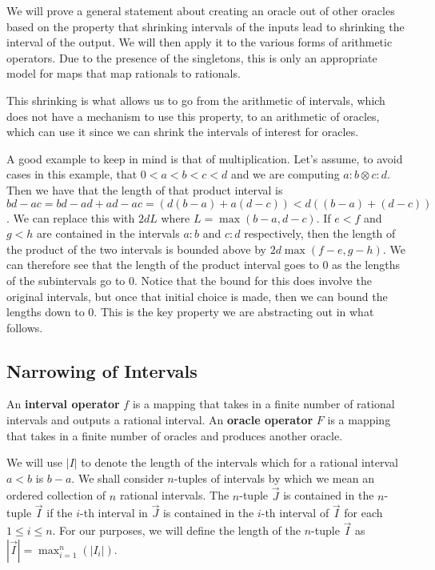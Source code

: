 \documentclass[12pt]{article}
\theoremstyle{remark}
\begin{document}
We will prove a general statement about creating an oracle out of other oracles based on the property that shrinking intervals of the inputs lead to shrinking the interval of the output. We will then apply it to the various forms of arithmetic operators. Due to the presence of the singletons, this is only an appropriate model for maps that map rationals to rationals.

This shrinking is what allows us to go from the arithmetic of intervals, which does not have a mechanism to use this property, to an arithmetic of oracles, which can use it since we can shrink the intervals of interest for oracles. 

A good example to keep in mind is that of multiplication. Let's assume, to avoid cases in this example, that  $0 < a < b < c < d$ and we are computing $a:b \otimes c:d$. Then we have that the length of that product interval is $bd-ac = bd-ad+ad - ac= (d(b-a) + a(d-c))< d ( ( b-a) + (d-c) )$. We can replace this with $2dL$ where $L = \max(b-a, d-c)$. If $e<f$ and $g<h$ are contained in the intervals $a:b$ and $c:d$ respectively, then the length of the product of the two intervals is bounded above by $2d\max(f-e, g-h)$. We can therefore see that the length of the product interval goes to 0 as the lengths of the subintervals go to 0. Notice that the bound for this does involve the original intervals, but once that initial choice is made, then we can bound the lengths down to 0. This is the key property we are abstracting out in what follows. 

\subsection{Narrowing of Intervals}

An \textbf{interval operator} $f$ is a mapping that takes in a finite number of rational intervals and outputs a rational interval. An \textbf{oracle operator} $F$ is a mapping that takes in a finite number of oracles and produces another oracle.

We will use $|I|$ to denote the length of the intervals which for a rational interval $a<b$ is $b-a$. We shall consider $n$-tuples of intervals by which we mean an ordered collection of $n$ rational intervals. The $n$-tuple $\vec{J}$ is contained in the $n$-tuple $\vec{I}$ if the $i$-th interval in $\vec{J}$ is contained in the $i$-th interval of $\vec{I}$ for each $1 \leq i \leq n$. For our purposes, we will define the length of the $n$-tuple $\vec{I}$ as $|\vec{I}| = \max_{i=1}^n (|I_i|)$.
\end{document}
